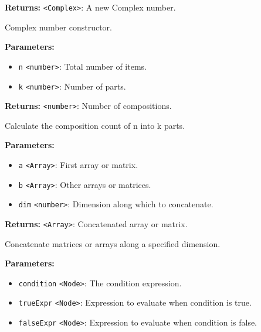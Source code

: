 \documentclass[12pt,a4paper]{article}
\begin{document}
\noindent \textbf{Returns:} \texttt{<Complex>}: A new Complex number.

\noindent Complex number constructor.

\vspace{5mm}
\noindent {}


\noindent \textbf{Parameters:}
\begin{itemize}
  \item \texttt{n} \texttt{<number>}: Total number of items.
  \item \texttt{k} \texttt{<number>}: Number of parts.
\end{itemize}

\noindent \textbf{Returns:} \texttt{<number>}: Number of compositions.

\noindent Calculate the composition count of n into k parts.

\vspace{5mm}
\noindent {}


\noindent \textbf{Parameters:}
\begin{itemize}
  \item \texttt{a} \texttt{<Array>}: First array or matrix.
  \item \texttt{b} \texttt{<Array>}: Other arrays or matrices.
  \item \texttt{dim} \texttt{<number>}: Dimension along which to concatenate.
\end{itemize}

\noindent \textbf{Returns:} \texttt{<Array>}: Concatenated array or matrix.

\noindent Concatenate matrices or arrays along a specified dimension.

\vspace{5mm}
\noindent {}


\noindent \textbf{Parameters:}
\begin{itemize}
  \item \texttt{condition} \texttt{<Node>}: The condition expression.
  \item \texttt{trueExpr} \texttt{<Node>}: Expression to evaluate when condition is true.
  \item \texttt{falseExpr} \texttt{<Node>}: Expression to evaluate when condition is false.
\end{itemize}
\end{document}
